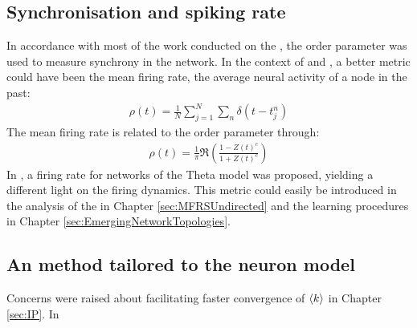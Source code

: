 \subsection{Synchronisation and spiking rate}
In accordance with most of the work conducted on the \MFR, the order parameter was used to measure synchrony in the network. In the context of \STDP and \IP, a better metric could have been the mean firing rate, the average neural activity of a node in the past:
\begin{align}
\rho(t)=\frac{1}{N} \sum_{j=1}^{N} \sum_{n} \delta\left(t-t_{j}^{n}\right)
\end{align}
The mean firing rate is related to the order parameter through:
\begin{align}
\rho(t) = \frac{1}{\pi} \Re \left(\frac{1-Z(t)^c}{1+Z(t)^c}\right)
\end{align}
In \cite{Montbrio2015}, a firing rate \MFR for networks of the Theta model was proposed, yielding a different light on the firing dynamics. This metric could easily be introduced in the analysis of the \MFR in Chapter \ref{sec:MFRSUndirected} and the learning procedures in Chapter \ref{sec:EmergingNetworkTopologies}.


\subsection{An \IP method tailored to the neuron model}
Concerns were raised about \IP facilitating faster convergence of ${\langle k\rangle}$ in Chapter \ref{sec:IP}. In \cite{Zhang2019}



